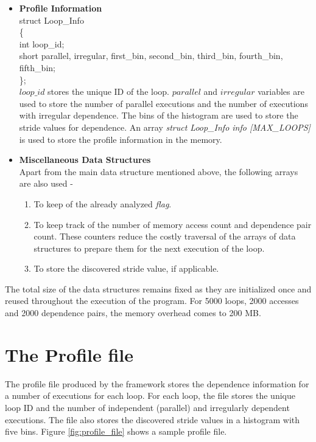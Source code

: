 \documentclass[10pt]{report}          %
\begin{document}
\begin{itemize}
\item \textbf{Profile Information} \\

struct Loop\_Info\\
\{\\
	\hspace*{1 cm} int loop\_id;\\
	\hspace*{1 cm} short parallel, irregular, first\_bin, second\_bin, third\_bin, fourth\_bin, fifth\_bin;\\
	
\};\\

$loop\_id$ stores the unique ID of the loop. $parallel$ and $irregular$ variables are used to store the number of parallel executions and the number of executions with irregular dependence.  The bins of the histogram are used to store the stride values for dependence.  An array \textit{struct Loop\_Info  info [MAX\_LOOPS]} is used to store the profile information in the memory.

\item \textbf{Miscellaneous Data Structures} \\

Apart from the main data structure mentioned above, the following arrays are also used -

\begin{enumerate}
\item To keep of the already analyzed \textit{flag}.
\item To keep track of the number of memory access count and dependence pair count.  These counters reduce the costly traversal of the arrays of data structures to prepare them for the next execution of the loop.
\item To store the discovered stride value, if applicable.
\end{enumerate}
\end{itemize}

The total size of the data structures remains fixed as they are initialized once and reused throughout the execution of the program.  For 5000 loops, 2000 accesses and 2000 dependence pairs, the memory overhead comes to 200 MB.

\section{The Profile file}

The profile file produced by the framework stores the dependence information for a number of executions for each loop. For each loop, the file stores the unique loop ID and the number of independent (parallel) and irregularly dependent executions.  The file also stores the discovered stride values in a histogram with five bins. 
Figure \ref{fig:profile_file} shows a sample profile file.\\
\end{document}
